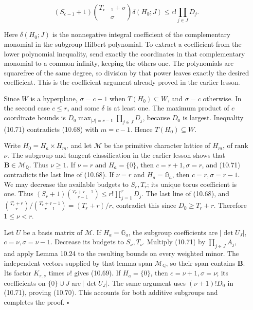 \documentclass[
  11pt,
  a4paper,
]{article}
\begin{document}
\[
(S_{c-1}+1)\binom{T_{c-1}+\sigma}{\sigma}\delta(H_0;J)
\le c!\prod_{j\in J}D_j.
\tag{10.71}
\]

Here \(\delta(H_0;J)\) is the nonnegative integral coefficient of the
complementary monomial in the subgroup Hilbert polynomial. To extract a
coefficient from the lower polynomial inequality, send exactly the
coordinates in that complementary monomial to a common infinity, keeping
the others one. The polynomials are squarefree of the same degree, so
division by that power leaves exactly the desired coefficient. This is
the coefficient argument already proved in the earlier lesson.

Since \(W\) is a hyperplane, \(\sigma=c-1\) when \(T(H_0)\subseteq W\),
and \(\sigma=c\) otherwise. In the second case \(c\le r\), and some
\(\delta\) is at least one. The maximum product of \(c\) coordinate
bounds is \(D_0\max_{|J|=c-1}\prod_{j\in J}D_j\), because \(D_0\) is
largest. Inequality (10.71) contradicts (10.68) with \(m=c-1\). Hence
\(T(H_0)\subseteq W\).

Write \(H_0=H_a\times H_m\), and let \(\mathcal M\) be the primitive
character lattice of \(H_m\), of rank \(\nu\). The subgroup and tangent
classification in the earlier lesson shows that
\(\boldsymbol B\in\mathcal M_{\mathbb Q}\). Thus \(\nu\ge1\). If
\(\nu=r\) and \(H_a=\{0\}\), then \(c=r+1,\sigma=r\), and (10.71)
contradicts the last line of (10.68). If \(\nu=r\) and
\(H_a=\mathbb G_a\), then \(c=r,\sigma=r-1\). We may decrease the
available budgets to \(S_r,T_r\); its unique torus coefficient is one.
Thus \((S_r+1)\binom{T_r+r-1}{r-1}\le r!\prod_{j=1}^rD_j\). The last
line of (10.68), and
\(\binom{T_r+r}{r}/\binom{T_r+r-1}{r-1}=(T_r+r)/r\), contradict this
since \(D_0\ge T_r+r\). Therefore \(1\le\nu<r\).

Let \(U\) be a basis matrix of \(\mathcal M\). If \(H_a=\mathbb G_a\),
the subgroup coefficients are \(|\det U_J|\), \(c=\nu,\sigma=\nu-1\).
Decrease its budgets to \(S_\nu,T_\nu\). Multiply (10.71) by
\(\prod_{j\in J}A_j\), and apply Lemma 10.24 to the resulting bounds on
every weighted minor. The independent vectors supplied by that lemma
span \(\mathcal M_{\mathbb Q}\), so their span contains
\(\boldsymbol B\). Its factor \(K_{r,\nu}\) times \(\nu!\) gives
(10.69). If \(H_a=\{0\}\), then \(c=\nu+1,\sigma=\nu\); its coefficients
on \(\{0\}\cup J\) are \(|\det U_J|\). The same argument uses
\((\nu+1)!D_0\) in (10.71), proving (10.70). This accounts for both
additive subgroups and completes the proof. \(\square\)
\end{document}
